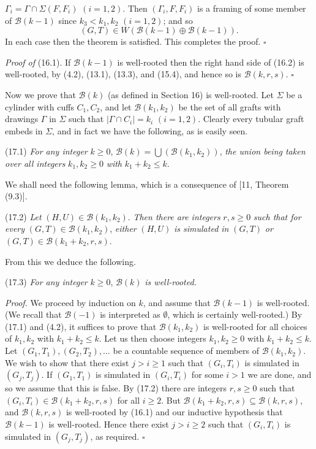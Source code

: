 \noindent $\Gamma_i = \Gamma \cap \Sigma(F, F_i)$ $(i = 1, 2)$. Then $(\Gamma_i, F, F_i)$ is a framing of some member of $\mathscr{B}(k - 1)$ since $k_3 < k_1, k_2$ $(i = 1, 2)$; and so
\begin{equation*}
(G, T) \in W(\mathscr{B}(k - 1) \oplus \mathscr{B}(k - 1)).
\end{equation*}
In each case then the theorem is satisfied. This completes the proof. $\square$

\textit{Proof of} (16.1). If $\mathscr{B}(k - 1)$ is well-rooted then the right hand side of (16.2) is well-rooted, by (4.2), (13.1), (13.3), and (15.4), and hence so is $\mathscr{B}(k, r, s)$. $\square$


Now we prove that $\mathscr{B}(k)$ (as defined in Section 16) is well-rooted. Let $\Sigma$ be a cylinder with cuffs $C_1, C_2$, and let $\mathscr{B}(k_1, k_2)$ be the set of all grafts with drawings $\Gamma$ in $\Sigma$ such that $|\Gamma \cap C_i| = k_i$ $(i = 1, 2)$. Clearly every tubular graft embeds in $\Sigma$, and in fact we have the following, as is easily seen.

\stmt
(17.1) \textit{For any integer} $k \ge 0$, $\mathscr{B}(k) = \bigcup (\mathscr{B}(k_1, k_2))$, \textit{the union being taken over all integers} $k_1, k_2 \ge 0$ \textit{with} $k_1 + k_2 \le k$.

We shall need the following lemma, which is a consequence of [11, Theorem (9.3)].

\stmt
(17.2) \textit{Let} $(H, U) \in \mathscr{B}(k_1, k_2)$. \textit{Then there are integers} $r, s \ge 0$ \textit{such that for every} $(G, T) \in \mathscr{B}(k_1, k_2)$, \textit{either} $(H, U)$ \textit{is simulated in} $(G, T)$ \textit{or} $(G, T) \in \mathscr{B}(k_1 + k_2, r, s)$.

From this we deduce the following.

\stmt
(17.3) \textit{For any integer} $k \ge 0$, $\mathscr{B}(k)$ \textit{is well-rooted.}

\textit{Proof.} We proceed by induction on $k$, and assume that $\mathscr{B}(k - 1)$ is well-rooted. (We recall that $\mathscr{B}(-1)$ is interpreted as $\emptyset$, which is certainly well-rooted.) By (17.1) and (4.2), it suffices to prove that $\mathscr{B}(k_1, k_2)$ is well-rooted for all choices of $k_1, k_2$ with $k_1 + k_2 \le k$. Let us then choose integers $k_1, k_2 \ge 0$ with $k_1 + k_2 \le k$. Let $(G_1, T_1), (G_2, T_2), \dots$ be a countable sequence of members of $\mathscr{B}(k_1, k_2)$. We wish to show that there exist $j > i \ge 1$ such that $(G_i, T_i)$ is simulated in $(G_j, T_j)$. If $(G_1, T_1)$ is simulated in $(G_i, T_i)$ for some $i > 1$ we are done, and so we assume that this is false. By (17.2) there are integers $r, s \ge 0$ such that $(G_i, T_i) \in \mathscr{B}(k_1 + k_2, r, s)$ for all $i \ge 2$. But $\mathscr{B}(k_1 + k_2, r, s) \subseteq \mathscr{B}(k, r, s)$, and $\mathscr{B}(k, r, s)$ is well-rooted by (16.1) and our inductive hypothesis that $\mathscr{B}(k - 1)$ is well-rooted. Hence there exist $j > i \ge 2$ such that $(G_i, T_i)$ is simulated in $(G_j, T_j)$, as required. $\square$
